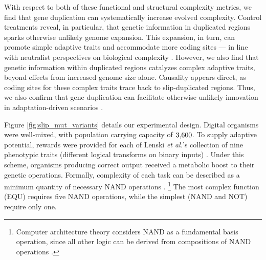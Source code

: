 With respect to both of these functional and structural complexity metrics, we find that gene duplication can systematically increase evolved complexity.
Control treatments reveal, in particular, that genetic information in duplicated regions sparks otherwise unlikely genome expansion.
This expansion, in turn, can promote simple adaptive traits and accommodate more coding sites --- in line with neutralist perspectives on biological complexity \citep{Lynch2000,Beslon2021,Lynch2007}.
However, we also find that genetic information within duplicated regions catalyzes complex adaptive traits, beyond effects from increased genome size alone.
Causality appears direct, as coding sites for these complex traits trace back to slip-duplicated regions.
Thus, we also confirm that gene duplication can facilitate otherwise unlikely innovation in adaptation-driven scenarios \citep{ohno1970evolution}.

Figure \ref{fig:slip_mut_variants} details our experimental design.
Digital organisms were well-mixed, with population carrying capacity of $3{\small,}600$.
To supply adaptive potential, rewards were provided for each of Lenski \textit{et al.}'s collection of nine phenotypic traits (different logical transforms on binary inputs) \citep{Lenski2003Evolutionary}.
Under this scheme, organisms producing correct output received a metabolic boost to their genetic operations.
Formally, complexity of each task can be described as a minimum quantity of necessary NAND operations \citep{Lenski2003Evolutionary}.
\unskip\footnote{
Computer architecture theory considers NAND as a fundamental basis operation, since all other logic can be derived from compositions of NAND operations \citep{mano1997logic}.
}
The most complex function (EQU) requires five NAND operations, while the simplest (NAND and NOT) require only one.

